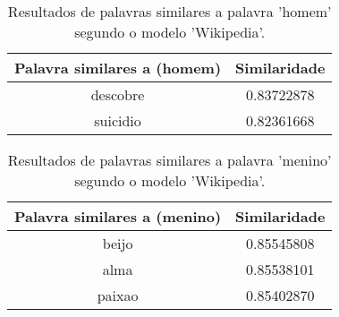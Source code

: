 \begin{table}[H]
\centering
\begin{tabular}{|c | c|}
 \hline
 Palavra similares a (homem) & Similaridade \\ [0.5ex]
 \hline
 descobre & 0.83722878 \\
 \hline
 suicidio & 0.82361668 \\
 \hline
\end{tabular}
\caption{Resultados de palavras similares a palavra 'homem' segundo o modelo 'Wikipedia'.}
\label{table:1}
\end{table}
\n\n\n\begin{table}[H]
\centering
\begin{tabular}{|c | c|}
 \hline
 Palavra similares a (menino) & Similaridade \\ [0.5ex]
 \hline
 beijo & 0.85545808 \\
 \hline
 alma & 0.85538101 \\
 \hline
 paixao & 0.85402870 \\
 \hline
\end{tabular}
\caption{Resultados de palavras similares a palavra 'menino' segundo o modelo 'Wikipedia'.}
\label{table:1}
\end{table}
\n\n\n